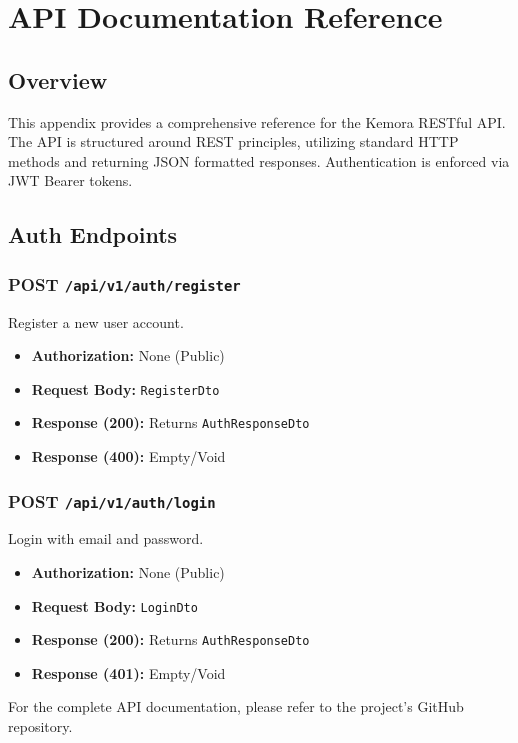 \appendix
\chapter{API Documentation Reference}

\section{Overview}
This appendix provides a comprehensive reference for the Kemora RESTful API. The API is structured around REST principles, utilizing standard HTTP methods and returning JSON formatted responses. Authentication is enforced via JWT Bearer tokens.

\section{Auth Endpoints}

\subsection{POST \texttt{/api/v1/auth/register}}
Register a new user account.
\begin{itemize}
    \item \textbf{Authorization:} None (Public)
    \item \textbf{Request Body:} \texttt{RegisterDto}
    \item \textbf{Response (200):} Returns \texttt{AuthResponseDto}
    \item \textbf{Response (400):} Empty/Void
\end{itemize}

\subsection{POST \texttt{/api/v1/auth/login}}
Login with email and password.
\begin{itemize}
    \item \textbf{Authorization:} None (Public)
    \item \textbf{Request Body:} \texttt{LoginDto}
    \item \textbf{Response (200):} Returns \texttt{AuthResponseDto}
    \item \textbf{Response (401):} Empty/Void
\end{itemize}

For the complete API documentation, please refer to the project's GitHub repository.
